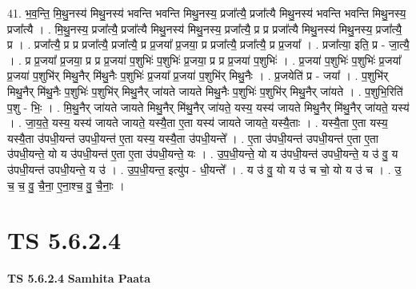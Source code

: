 \documentclass[17pt]{extarticle}
\begin{document}
41. भ॒व॒न्ति॒ मि॒थु॒नस्य॑ मिथु॒नस्य॑ भवन्ति भवन्ति मिथु॒नस्य॒ प्रजा᳚त्यै॒ प्रजा᳚त्यै मिथु॒नस्य॑ भवन्ति भवन्ति मिथु॒नस्य॒ प्रजा᳚त्यै । . मि॒थु॒नस्य॒ प्रजा᳚त्यै॒ प्रजा᳚त्यै मिथु॒नस्य॑ मिथु॒नस्य॒ प्रजा᳚त्यै॒ प्र प्र प्रजा᳚त्यै मिथु॒नस्य॑ मिथु॒नस्य॒ प्रजा᳚त्यै॒ प्र । . प्रजा᳚त्यै॒ प्र प्र प्रजा᳚त्यै॒ प्रजा᳚त्यै॒ प्र प्र॒जया᳚ प्र॒जया॒ प्र प्रजा᳚त्यै॒ प्रजा᳚त्यै॒ प्र प्र॒जया᳚ । . प्रजा᳚त्या॒ इति॒ प्र - जा॒त्यै॒ । . प्र प्र॒जया᳚ प्र॒जया॒ प्र प्र प्र॒जया॑ प॒शुभिः॑ प॒शुभिः॑ प्र॒जया॒ प्र प्र प्र॒जया॑ प॒शुभिः॑ । . प्र॒जया॑ प॒शुभिः॑ प॒शुभिः॑ प्र॒जया᳚ प्र॒जया॑ प॒शुभि॑र् मिथु॒नैर् मि॑थु॒नैः प॒शुभिः॑ प्र॒जया᳚ प्र॒जया॑ प॒शुभि॑र् मिथु॒नैः । . प्र॒जयेति॑ प्र - जया᳚ । . प॒शुभि॑र् मिथु॒नैर् मि॑थु॒नैः प॒शुभिः॑ प॒शुभि॑र् मिथु॒नैर् जा॑यते जायते मिथु॒नैः प॒शुभिः॑ प॒शुभि॑र् मिथु॒नैर् जा॑यते । . प॒शुभि॒रिति॑ प॒शु - भिः॒ । . मि॒थु॒नैर् जा॑यते जायते मिथु॒नैर् मि॑थु॒नैर् जा॑यते॒ यस्य॒ यस्य॑ जायते मिथु॒नैर् मि॑थु॒नैर् जा॑यते॒ यस्य॑ । . जा॒य॒ते॒ यस्य॒ यस्य॑ जायते जायते॒ यस्यै॒ता ए॒ता यस्य॑ जायते जायते॒ यस्यै॒ताः । . यस्यै॒ता ए॒ता यस्य॒ यस्यै॒ता उ॑पधी॒यन्त॑ उपधी॒यन्त॑ ए॒ता यस्य॒ यस्यै॒ता उ॑पधी॒यन्ते᳚ । . ए॒ता उ॑पधी॒यन्त॑ उपधी॒यन्त॑ ए॒ता ए॒ता उ॑पधी॒यन्ते॒ यो य उ॑पधी॒यन्त॑ ए॒ता ए॒ता उ॑पधी॒यन्ते॒ यः । . उ॒प॒धी॒यन्ते॒ यो य उ॑पधी॒यन्त॑ उपधी॒यन्ते॒ य उ॑ वु॒ य उ॑पधी॒यन्त॑ उपधी॒यन्ते॒ य उ॑ । . उ॒प॒धी॒यन्त॒ इत्यु॑प - धी॒यन्ते᳚ । . य उ॑ वु॒ यो य उ॑ च चो॒ यो य उ॑ च । . उ॒ च॒ च॒ वु॒ चै॒ना॒ ए॒ना॒श्च॒ वु॒ चै॒नाः॒ । \newline
\pagebreak
{}

\section{ TS 5.6.2.4 }

\textbf{TS 5.6.2.4 } \newline
\textbf{Samhita Paata} \newline
\end{document}
